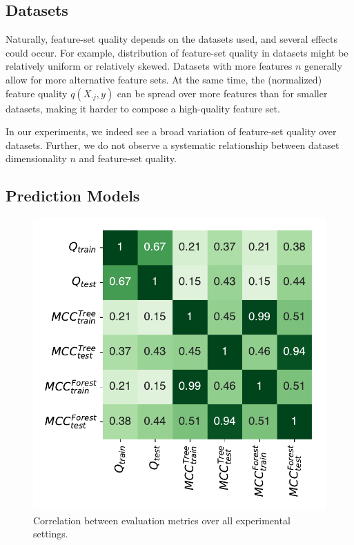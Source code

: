 \documentclass[conference]{IEEEtran}
\theoremstyle{definition}
\begin{document}
\subsection{Datasets}

Naturally, feature-set quality depends on the datasets used, and several effects could occur.
For example, distribution of feature-set quality in datasets might be relatively uniform or relatively skewed.
Datasets with more features $n$ generally allow for more alternative feature sets.
At the same time, the (normalized) feature quality $q(X_{\cdot{}j},y)$ can be spread over more features than for smaller datasets, making it harder to compose a high-quality feature set.

In our experiments, we indeed see a broad variation of feature-set quality over datasets.
Further, we do not observe a systematic relationship between dataset dimensionality $n$ and feature-set quality.

\subsection{Prediction Models}

\begin{figure}[t]
	\centering
	\includegraphics[width=\columnwidth]{plots/evaluation-metrics-correlation.pdf}
	\caption{Correlation between evaluation metrics over all experimental settings.}
	\label{fig:evaluation-metrics-correlation}
\end{figure}
\end{document}
